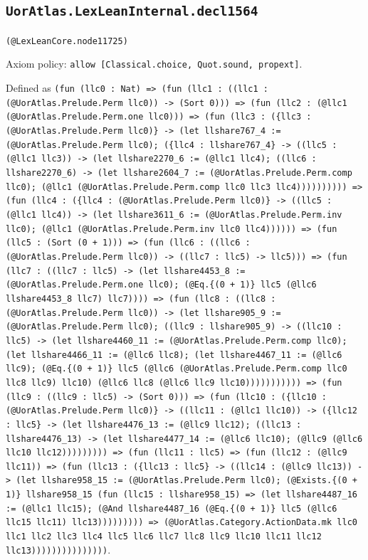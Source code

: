 \documentclass[11pt]{article}
\begin{document}
\subsection*{\texttt{UorAtlas.LexLeanInternal.decl1564}}
\noindent\texttt{(@LexLeanCore.node11725)}\par
\noindent Axiom policy: \texttt{allow [Classical.choice, Quot.sound, propext]}.\par
\noindent Defined as \texttt{(fun (llc0 : Nat) => (fun (llc1 : ((llc1 : (@UorAtlas.Prelude.Perm llc0)) -> (Sort 0))) => (fun (llc2 : (@llc1 (@UorAtlas.Prelude.Perm.one llc0))) => (fun (llc3 : (\{llc3 : (@UorAtlas.Prelude.Perm llc0)\} -> (let llshare767\_4 := (@UorAtlas.Prelude.Perm llc0); (\{llc4 : llshare767\_4\} -> ((llc5 : (@llc1 llc3)) -> (let llshare2270\_6 := (@llc1 llc4); ((llc6 : llshare2270\_6) -> (let llshare2604\_7 := (@UorAtlas.Prelude.Perm.comp llc0); (@llc1 (@UorAtlas.Prelude.Perm.comp llc0 llc3 llc4)))))))))) => (fun (llc4 : (\{llc4 : (@UorAtlas.Prelude.Perm llc0)\} -> ((llc5 : (@llc1 llc4)) -> (let llshare3611\_6 := (@UorAtlas.Prelude.Perm.inv llc0); (@llc1 (@UorAtlas.Prelude.Perm.inv llc0 llc4)))))) => (fun (llc5 : (Sort (0 + 1))) => (fun (llc6 : ((llc6 : (@UorAtlas.Prelude.Perm llc0)) -> ((llc7 : llc5) -> llc5))) => (fun (llc7 : ((llc7 : llc5) -> (let llshare4453\_8 := (@UorAtlas.Prelude.Perm.one llc0); (@Eq.\{(0 + 1)\} llc5 (@llc6 llshare4453\_8 llc7) llc7)))) => (fun (llc8 : ((llc8 : (@UorAtlas.Prelude.Perm llc0)) -> (let llshare905\_9 := (@UorAtlas.Prelude.Perm llc0); ((llc9 : llshare905\_9) -> ((llc10 : llc5) -> (let llshare4460\_11 := (@UorAtlas.Prelude.Perm.comp llc0); (let llshare4466\_11 := (@llc6 llc8); (let llshare4467\_11 := (@llc6 llc9); (@Eq.\{(0 + 1)\} llc5 (@llc6 (@UorAtlas.Prelude.Perm.comp llc0 llc8 llc9) llc10) (@llc6 llc8 (@llc6 llc9 llc10))))))))))) => (fun (llc9 : ((llc9 : llc5) -> (Sort 0))) => (fun (llc10 : (\{llc10 : (@UorAtlas.Prelude.Perm llc0)\} -> ((llc11 : (@llc1 llc10)) -> (\{llc12 : llc5\} -> (let llshare4476\_13 := (@llc9 llc12); ((llc13 : llshare4476\_13) -> (let llshare4477\_14 := (@llc6 llc10); (@llc9 (@llc6 llc10 llc12))))))))) => (fun (llc11 : llc5) => (fun (llc12 : (@llc9 llc11)) => (fun (llc13 : (\{llc13 : llc5\} -> ((llc14 : (@llc9 llc13)) -> (let llshare958\_15 := (@UorAtlas.Prelude.Perm llc0); (@Exists.\{(0 + 1)\} llshare958\_15 (fun (llc15 : llshare958\_15) => (let llshare4487\_16 := (@llc1 llc15); (@And llshare4487\_16 (@Eq.\{(0 + 1)\} llc5 (@llc6 llc15 llc11) llc13))))))))) => (@UorAtlas.Category.ActionData.mk llc0 llc1 llc2 llc3 llc4 llc5 llc6 llc7 llc8 llc9 llc10 llc11 llc12 llc13)))))))))))))))}.\par
\end{document}
